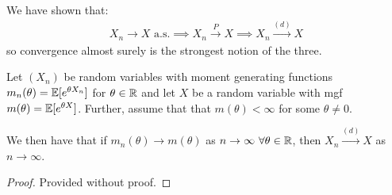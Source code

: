 \documentclass[../main.tex]{subfiles}
\begin{document}
\begin{remark}
  We have shown that:
  \begin{align*}
    X_n \to X \text{ a.s.} \implies X_n \xrightarrow{P} X \implies X_n \xrightarrow{(d)} X
  \end{align*}
  so convergence almost surely is the strongest notion of the three.
\end{remark}
\begin{theorem}
  Let $(X_n)$ be random variables with moment generating functions $m_n(\theta) = \mathbb{E}[e^{\theta X_n}]$ for $\theta \in \mathbb{R}$ and let $X$ be a random variable with mgf $m(\theta) = \mathbb{E}[e^{\theta X}]$.
  Further, assume that that $m(\theta) < \infty$ for some $\theta \neq 0$. \label{mgfCty}

  We then have that if $m_n(\theta) \to m(\theta)$ as $n \to \infty\ \forall \theta \in \mathbb{R}$, then $X_n \xrightarrow{(d)} X$ as $n \to \infty$.
\end{theorem}
\begin{proof}
  Provided without proof.
\end{proof}
\end{document}
